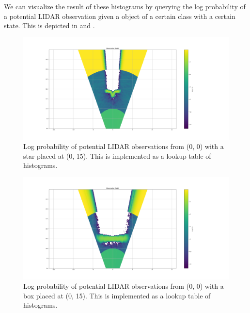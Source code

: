 We can visualize the result of these histograms by querying the log probability
of a potential LIDAR observation given a object of a certain class with a
certain state. This is depicted in  and
.
%
\begin{figure}
  \centering
  \includegraphics[width=\textwidth]{figures/star_model.png}
  \caption{Log probability of potential LIDAR observations from (0, 0) with a
    star placed at (0, 15). This is implemented as a lookup table of histograms.}
  \label{fig:star_model}
\end{figure}
%
\begin{figure}
  \centering
  \includegraphics[width=\textwidth]{figures/box_model.png}
  \caption{Log probability of potential LIDAR observations from (0, 0) with a
    box placed at (0, 15). This is implemented as a lookup table of histograms.}
  \label{fig:box_model}
\end{figure}
